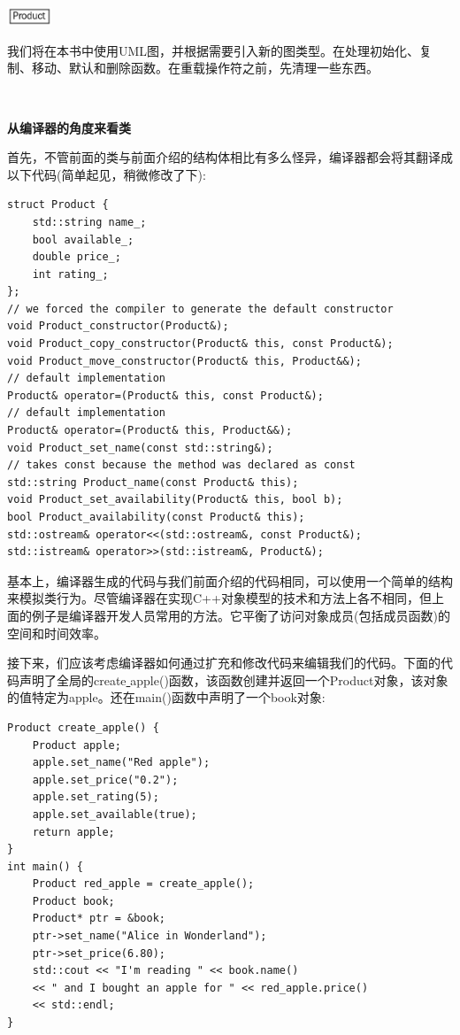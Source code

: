 \begin{center}
	\includegraphics[width=0.1\textwidth]{content/Section-1/Chapter-3/6}
\end{center}

我们将在本书中使用UML图，并根据需要引入新的图类型。在处理初始化、复制、移动、默认和删除函数。在重载操作符之前，先清理一些东西。 \par

\noindent\textbf{}\ \par
\textbf{从编译器的角度来看类} \ \par
首先，不管前面的类与前面介绍的结构体相比有多么怪异，编译器都会将其翻译成以下代码(简单起见，稍微修改了下):\par

\begin{lstlisting}[caption={}]
struct Product {
	std::string name_;
	bool available_;
	double price_;
	int rating_;
};
// we forced the compiler to generate the default constructor
void Product_constructor(Product&);
void Product_copy_constructor(Product& this, const Product&);
void Product_move_constructor(Product& this, Product&&);
// default implementation
Product& operator=(Product& this, const Product&);
// default implementation
Product& operator=(Product& this, Product&&);
void Product_set_name(const std::string&);
// takes const because the method was declared as const
std::string Product_name(const Product& this);
void Product_set_availability(Product& this, bool b);
bool Product_availability(const Product& this);
std::ostream& operator<<(std::ostream&, const Product&);
std::istream& operator>>(std::istream&, Product&);
\end{lstlisting}

基本上，编译器生成的代码与我们前面介绍的代码相同，可以使用一个简单的结构来模拟类行为。尽管编译器在实现C++对象模型的技术和方法上各不相同，但上面的例子是编译器开发人员常用的方法。它平衡了访问对象成员(包括成员函数)的空间和时间效率。 \par
接下来，们应该考虑编译器如何通过扩充和修改代码来编辑我们的代码。下面的代码声明了全局的create\underline{ }apple()函数，该函数创建并返回一个Product对象，该对象的值特定为apple。还在main()函数中声明了一个book对象: \par

\begin{lstlisting}[caption={}]
Product create_apple() {
	Product apple;
	apple.set_name("Red apple");
	apple.set_price("0.2");
	apple.set_rating(5);
	apple.set_available(true);
	return apple;
}
int main() {
	Product red_apple = create_apple();
	Product book;
	Product* ptr = &book;
	ptr->set_name("Alice in Wonderland");
	ptr->set_price(6.80);
	std::cout << "I'm reading " << book.name()
	<< " and I bought an apple for " << red_apple.price()
	<< std::endl;
}
\end{lstlisting}

